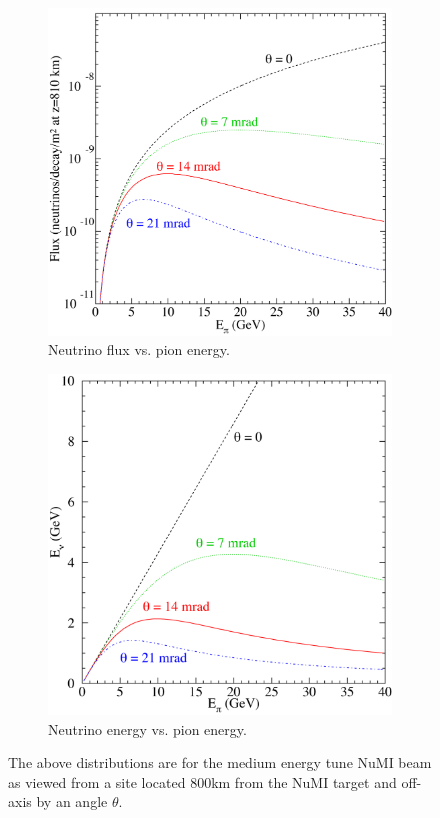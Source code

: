 \begin{figure}
  \centering
  \begin{subfigure}[b]{0.45\textwidth}
  \includegraphics[width=\textwidth]{../../img/baird/beam/020-flux.png}
  \caption{Neutrino flux vs. pion energy. }
  \label{fig:NuPiFluxa}
  \end{subfigure}
  \hfill
  \begin{subfigure}[b]{0.45\textwidth}
  \includegraphics[width=\textwidth]{../../img/baird/beam/030-epi2enu.png}
  \caption{Neutrino energy vs. pion energy.}
  \label{fig:NuPiFluxb}
  \end{subfigure}
  \caption{The above distributions are for the medium energy tune NuMI
    beam as viewed from a site located
    800km from the NuMI target and off-axis by an angle $\theta$. }
  \label{fig:NuPiFlux}
\end{figure}



